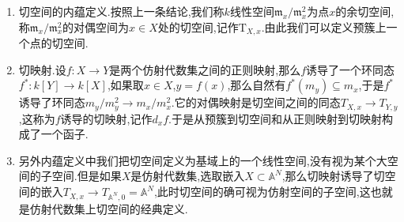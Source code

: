 \begin{enumerate}
\begin{proof}
		证明满射:任取$T_{X,x}$上的线性函数$\sum_{1\le i\le N}\lambda_i(T_i-x_i)$,这个线性函数本身作为$k[X]$中的元的微分是它本身.证明核是$\mathfrak{n}_x^2$:不妨设$x=0$,设$g\in n_x$满足$d_xg=0$,选取$g$的一个多项式表示$G$,按照定义$d_xG=0$,而切空间被$\{d_xF_i\}$定义,它们都是线性的,于是存在一些系数$\lambda_i$使得$d_xG=\sum_{1\le i\le m}\lambda_id_xF_i$.记$G_1=G-\sum_{1\le i\le m}\lambda_iF_i$,那么$G_1$没有不超过1次的项,导致$G_1\in(T_1,T_2,\cdots,T_m)^2$.但是$G_1$和$G$在$X$上的限制相同,于是$G_1$也是$g$的一个多项式表示,于是$g\in(t_1,t_2,\cdots,t_N)^2=n_x^2$,其中$t_i$是$T_i$在$X$上的限制.
	\end{proof}
    \item 切空间的内蕴定义.按照上一条结论,我们称$k$线性空间$\mathfrak{m}_x/\mathfrak{m}_x^2$为点$x$的余切空间,称$\mathfrak{m}_x/\mathfrak{m}_x^2$的对偶空间为$x\in X$处的切空间,记作$\mathrm{T}_{X,x}$.由此我们可以定义预簇上一个点的切空间.
    \item 切映射.设$f:X\to Y$是两个仿射代数集之间的正则映射,那么$f$诱导了一个环同态$f^*:k[Y]\to k[X]$,如果取$x\in X$,$y=f(x)$,那么自然有$f^*(m_y)\subseteq m_x$,于是$f^*$诱导了环同态$m_y/m_y^2\to m_x/m_x^2$.它的对偶映射是切空间之间的同态$T_{X,x}\to T_{Y,y}$,这称为$f$诱导的切映射,记作$d_xf$.于是从预簇到切空间和从正则映射到切映射构成了一个函子.
    \item 另外内蕴定义中我们把切空间定义为基域上的一个线性空间,没有视为某个大空间的子空间.但是如果$X$是仿射代数集,选取嵌入$X\subset\mathbb{A}^N$,那么切映射诱导了切空间的嵌入$T_{X,x}\to T_{\mathbb{A}^N,0}=\mathbb{A}^N$,此时切空间的确可视为仿射空间的子空间,这也就是仿射代数集上切空间的经典定义.
\end{enumerate}

